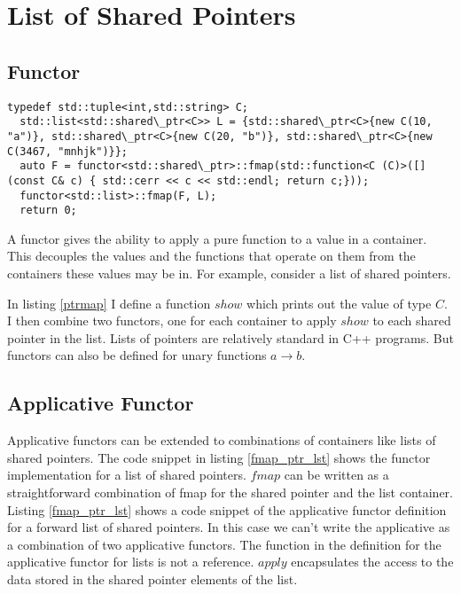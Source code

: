 \documentclass[12pt,fleqn]{article}
\begin{document}
%
\section{List of Shared Pointers}
%
%
%

\subsection{Functor}
%
%


%
%
\begin{minipage}{\linewidth}
\begin{lstlisting}[caption=mapping over a list of shared pointers, label=ptrmap]
  typedef std::tuple<int,std::string> C;
  std::list<std::shared\_ptr<C>> L = {std::shared\_ptr<C>{new C(10, "a")}, std::shared\_ptr<C>{new C(20, "b")}, std::shared\_ptr<C>{new C(3467, "mnhjk")}};
  auto F = functor<std::shared\_ptr>::fmap(std::function<C (C)>([](const C& c) { std::cerr << c << std::endl; return c;}));
  functor<std::list>::fmap(F, L);
  return 0;
\end{lstlisting}
\end{minipage}
%
%
%

A functor gives the ability to apply a pure function to a value in a container.
This decouples the values and the functions that operate on them from the containers these values may be in.
For example, consider a list of shared pointers.

In listing \ref{ptrmap} I define a function $show$ which prints out the value of type $C$. I then combine two functors, one for each container to apply $show$ 
to each shared pointer in the list.
Lists of pointers are relatively standard in C++ programs. But functors can also be defined for unary functions $a \rightarrow b$.

%
%
%
\subsection{Applicative Functor}
%
%

Applicative functors can be extended to combinations of containers like lists of shared pointers.
The code snippet in listing \ref{fmap_ptr_lst} shows the functor implementation for a list of shared pointers.
$fmap$ can be written as a straightforward combination of fmap for the shared pointer and the list container.
Listing \ref{fmap_ptr_lst} shows a code snippet of the applicative functor definition for a forward list of shared pointers.
In this case we can't write the applicative as a combination of two applicative functors. 
The function in the definition for the applicative functor for lists is not a reference.
$apply$ encapsulates the access to the data stored in the shared pointer elements of the list.
\end{document}
